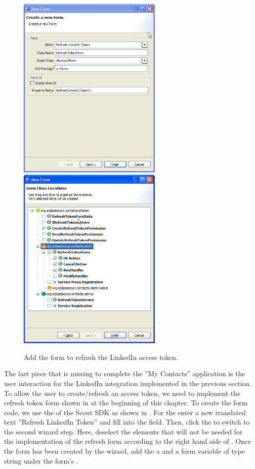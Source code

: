 \documentclass[a4paper,10pt,twoside]{book}
\begin{document}
\begin{figure}
\includegraphics[width=7cm]{new_form_token_1.png} \hspace{5mm}
\includegraphics[width=7cm]{new_form_token_2.png}
\caption{Add the form to refresh the LinkedIn access token.}
\end{figure}

The last piece that is missing to complete the ''My Contacts'' application is the user interaction for the LinkedIn integration implemented in the previous section. 
To allow the user to create/refresh an access token, we need to implement the refresh token form shown in  at the beginning of this chapter. 
To create the form code, we use the  of the Scout SDK as shown in . 
For the  enter a new translated text ''Refresh LinkedIn Token'' and fill  into the  field. 
Then, click the  to switch to the second wizard step. 
Here, deselect the elements that will not be needed for the implementation of the refresh form according to the right hand side of . 
Once the form has been created by the wizard, add the a  and a  form variable of type string under the form's . 
\end{document}
